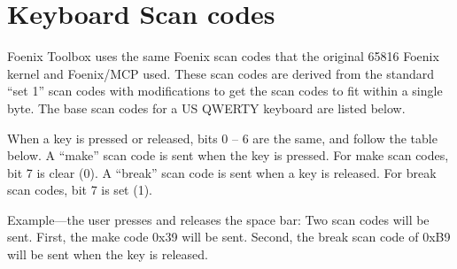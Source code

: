 


\section{Keyboard Scan codes}
Foenix Toolbox uses the same Foenix scan codes that the original 65816 Foenix kernel and Foenix/MCP used.
These scan codes are derived from the standard ``set 1'' scan codes with modifications to get the scan codes to fit within a single byte.
The base scan codes for a US QWERTY keyboard are listed below.

When a key is pressed or released, bits 0 -- 6 are the same, and follow the table below.
A ``make'' scan code is sent when the key is pressed.
For make scan codes, bit 7 is clear (0).
A ``break'' scan code is sent when a key is released.
For break scan codes, bit 7 is set (1).

Example---the user presses and releases the space bar: Two scan codes will be sent.
First, the make code 0x39 will be sent.
Second, the break scan code of 0xB9 will be sent when the key is released.

